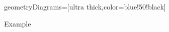 
\graphicspath{{./}{ParentFunctions2/}}

\usepackage{tikz}
\usepackage{tkz-euclide}

\tikzstyle geometryDiagrams=[ultra thick,color=blue!50!black]

Example